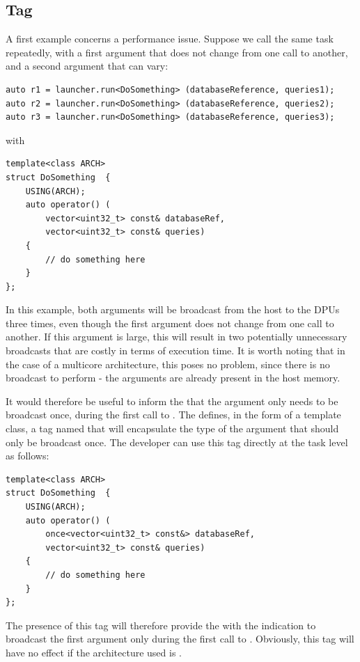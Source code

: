 \subsection{Tag }

A first example concerns a performance issue. Suppose we call the same task repeatedly, with a first argument that does not change
 from one call to another, and a second argument that can vary:
 \begin{verbatim}
auto r1 = launcher.run<DoSomething> (databaseReference, queries1);
auto r2 = launcher.run<DoSomething> (databaseReference, queries2);
auto r3 = launcher.run<DoSomething> (databaseReference, queries3);
\end{verbatim}
with
\begin{verbatim}
template<class ARCH>
struct DoSomething  {
    USING(ARCH);
    auto operator() (
        vector<uint32_t> const& databaseRef, 
        vector<uint32_t> const& queries)  
    {
        // do something here
    }
};
\end{verbatim}


In this example, both arguments will be broadcast from the host to the DPUs three times, even though the first argument
 does not change from one call to another. If this argument is large, this will result in two potentially unnecessary
  broadcasts that are costly in terms of execution time.
It is worth noting that in the case of a multicore architecture, this poses no problem, since there is no broadcast to perform
- the arguments are already present in the host memory.  

It would therefore be useful to inform the \BPL that the argument  only needs to be broadcast once,
 during the first call to . The \BPL defines, in the form of a template class, a tag named  
 that will encapsulate the type of the argument that should only be broadcast once. 
 The developer can use this tag directly at the task level as follows:
 \begin{verbatim}
template<class ARCH>
struct DoSomething  {
    USING(ARCH);
    auto operator() (
        once<vector<uint32_t> const&> databaseRef, 
        vector<uint32_t> const& queries)  
    {
        // do something here
    }
};
\end{verbatim}
The presence of this  tag will therefore provide the \BPL with the indication to broadcast the first argument only 
during the first call to .
Obviously, this tag will have no effect if the architecture used is .

